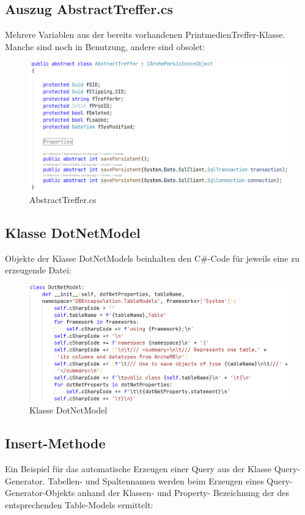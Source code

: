 \documentclass[11pt,toc=sectionentrywithoutdots, 
headheight=44pt, headings=optiontoheadandtoc, hyperfootnotes=false, hypertexnames=false]{scrartcl}
\begin{document}
  \subsection{Auszug AbstractTreffer.cs}
 \label{fig:AbstractTreffer.cs}
Mehrere Variablen aus der bereits vorhandenen PrintmedienTreffer-Klasse. Manche sind noch in Benutzung, andere sind obsolet:
 \begin{figure}[htp]
 \centering

	\includegraphics[scale=0.7]{abstractTreffer.png}
	 \caption{AbstractTreffer.cs}
 \end{figure}
 
 \subsection{Klasse DotNetModel}
Objekte der Klasse DotNetModels beinhalten den C\#-Code für jeweils eine zu erzeugende Datei:
 \label{fig:DotNetModel}

 \begin{figure}[H]
 \centering

	\includegraphics[scale=0.55]{dotNetModel.PNG}
	 \caption{Klasse DotNetModel}
 \end{figure}
 \clearpage
 
 \subsection{Insert-Methode}
Ein Beispiel für das automatische Erzeugen einer Query aus der Klasse Query-Generator. Tabellen- und Spaltennamen werden beim Erzeugen eines Query-Generator-Objekts anhand der Klassen- und Property- Bezeichnung der des entsprechenden Table-Models ermittelt:
 \label{fig:Insert-Methode}
\end{document}
